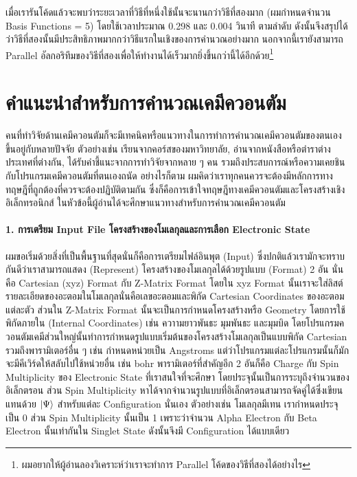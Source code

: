 \vspace{5pt}

เมื่อเรารันโค้ดแล้วจะพบว่าระยะเวลาที่วิธีที่หนึ่งใช้นั้นจะนานกว่าวิธีที่สองมาก (ผมกำหนดจำนวน Basis Functions = 5) โดยใช้เวลาประมาณ 0.298 และ 0.004 วินาที ตามลำดับ ดังนั้นจึงสรุปได้ว่าวิธีที่สองนั้นมีประสิทธิภาพมากกว่าวิธีแรกในเชิงของการคำนวณอย่างมาก นอกจากนี้เรายังสามารถ Parallel อัลกอริทึมของวิธีที่สองเพื่อให้ทำงานได้เร็วมากยิ่งขึ้นกว่านี้ได้อีกด้วย\footnote{ผมอยากให้ผู้อ่านลองวิเคราะห์ว่าเราจะทำการ Parallel โค้ดของวิธีที่สองได้อย่างไร}

\section{คำแนะนำสำหรับการคำนวณเคมีควอนตัม}

คนที่ทำวิจัยด้านเคมีควอนตัมก็จะมีเทคนิคหรือแนวทางในการทำการคำนวณเคมีควอนตัมของตนเอง ขึ้นอยู่กับหลายปัจจัย ตัวอย่างเช่น เรียนจากคอร์สของมหาวิทยาลัย, อ่านจากหนังสือหรือตำราต่างประเทศที่ต่างกัน, ได้รับคำชี้แนะจากการทำวิจัยจากหลาย ๆ คน รวมถึงประสบการณ์หรือความเคยชินกับโปรแกรมเคมีควอนตัมที่ตนเองถนัด อย่างไรก็ตาม ผมคิดว่าเราทุกคนควรจะต้องมีหลักการทางทฤษฎีที่ถูกต้องที่ควรจะต้องปฏิบัติตามกัน ซึ่งก็คือการเข้าใจทฤษฎีทางเคมีควอนตัมและโครงสร้างเชิงอิเล็กทรอนิกส์ ในหัวข้อนี้ผู้อ่านได้จะศึกษาแนวทางสำหรับการคำนวณเคมีควอนตัม

\paragraph{1. การเตรียม Input File โครงสร้างของโมเลกุลและการเลือก Electronic State}
%
ผมขอเริ่มด้วยสิ่งที่เป็นพื้นฐานที่สุดนั่นก็คือการเตรียมไฟล์อินพุต (Input) ซึ่งปกติแล้วเรามักจะทราบกันดีว่าเราสามารถแสดง (Represent) โครงสร้างของโมเลกุลได้ด้วยรูปแบบ (Format) 2 อัน นั่นคือ Cartesian (xyz) Format กับ Z-Matrix Format โดยใน xyz Format นั้นเราจะใส่ลิสต์รายละเอียดของอะตอมในโมเลกุลนั่นคือเลขอะตอมและพิกัด Cartesian Coordinates ของอะตอมแต่ละตัว ส่วนใน Z-Matrix Format นั้นจะเป็นการกำหนดโครงสร้างหรือ Geometry โดยการใช้พิกัดภายใน (Internal Coordinates) เช่น ควาามยาวพันธะ มุมพันธะ และมุมบิด โดยโปรแกรมควอนตัมเคมีส่วนใหญ่นั้นทำการกำหนดรูปแบบเริ่มต้นของโครงสร้างโมเลกุลเป็นแบบพิกัด Cartesian รวมถึงพารามิเตอร์อื่น ๆ เช่น กำหนดหน่วยเป็น Angstroms แต่ว่าโปรแกรมแต่ละโปรแกรมนั้นก็มักจะมีคีเวิร์ดให้สลับไปใช้หน่วยอื่น เช่น bohr พารามิเตอร์ที่สำคัญอีก 2 อันก็คือ Charge กับ Spin Multiplicity ของ Electronic State ที่เราสนใจที่จะศึกษา โดยประจุนั้นเป็นการระบุถึงจำนวนของอิเล็กตรอน ส่วน Spin Multiplicity หาได้จากจำนวนรูปแบบที่อิเล็กตรอนสามารถจัดคู่ได้ซึ่งเขียนแทนด้วย $\ket{\Psi}$ สำหรับแต่ละ Configuration นั่นเอง ตัวอย่างเช่น โมเลกุลมีเทน  เรากำหนดประจุเป็น 0 ส่วน Spin Multiplicity นั้นเป็น 1 เพราะว่าจำนวน Alpha Electron กับ Beta Electron นั้นเท่ากันใน Singlet State ดังนั้นจึงมี Configuration ได้แบบเดียว


